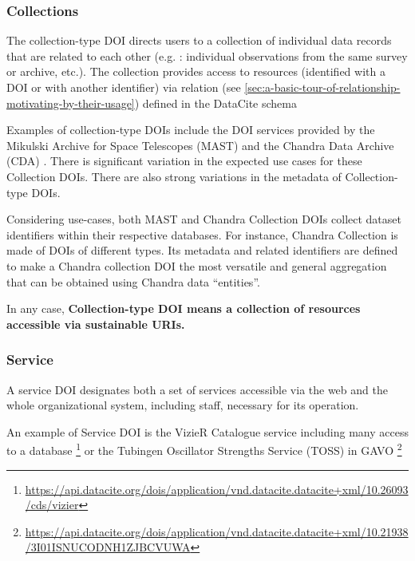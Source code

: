 \documentclass[11pt,a4paper]{ivoa}
\begin{document}
\subsubsection{Collections}\hypertarget{collections}{}\label{sec:collections}

The collection-type DOI directs users to a collection of individual data records that are related to each other (e.g. : individual observations from the same survey or archive, etc.). The collection provides access to resources (identified with a DOI or with another identifier) via relation (see  \ref{sec:a-basic-tour-of-relationship-motivating-by-their-usage}) defined in the DataCite schema \citep{https://doi.org/10.14454/mzv1-5b55}

Examples of collection-type DOIs include the DOI services provided by the Mikulski Archive for Space Telescopes (MAST) \citep{2018ApJS..236...20N} and the Chandra Data Archive (CDA) \citep{2018EPJWC.18612011R}. There is significant variation in the expected use cases for these Collection DOIs. There are also strong variations in the metadata of Collection-type DOIs.

Considering use-cases, both MAST and Chandra Collection DOIs collect dataset identifiers within their respective databases. For instance, Chandra Collection is made of DOIs of different types. Its metadata and related identifiers are defined to make a Chandra collection DOI the most versatile and general aggregation that can be obtained using Chandra data ``entities''.


In any case, \textbf{Collection-type DOI means a collection of resources accessible via sustainable URIs.}

\subsubsection{Service}\hypertarget{service}{}\label{sec:service}

A service DOI  designates both a set of services accessible via the web and the whole organizational system, including staff, necessary for its operation.

An example of Service DOI is the VizieR Catalogue service including many access to a database \footnote{\url{https://api.datacite.org/dois/application/vnd.datacite.datacite+xml/10.26093/cds/vizier}} or the Tubingen Oscillator Strengths Service (TOSS) in GAVO \footnote{\url{https://api.datacite.org/dois/application/vnd.datacite.datacite+xml/10.21938/3I01ISNUCODNH1ZJBCVUWA}}
\end{document}
